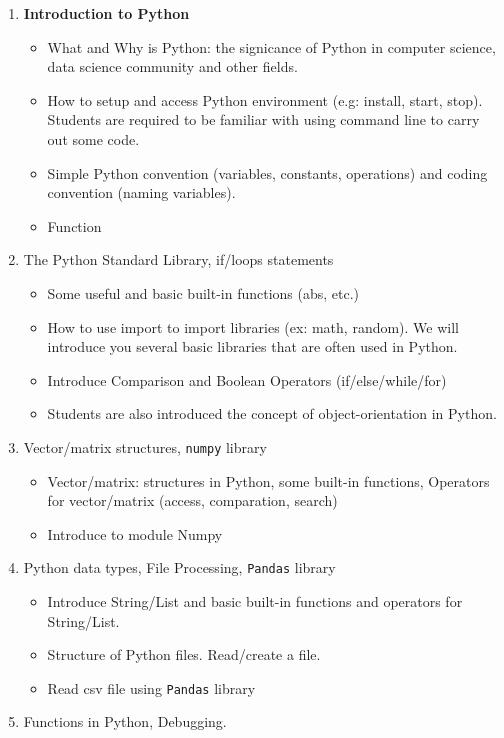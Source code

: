 \documentclass[11pt]{article}
\providecommand{\tightlist}{%
      \setlength{\itemsep}{0pt}\setlength{\parskip}{0pt}}
\begin{document}
\begin{enumerate}
\def\labelenumi{\arabic{enumi}.}
\item
  \textbf{Introduction to Python}

  \begin{itemize}
  \tightlist
  \item
    What and Why is Python: the signicance of Python in computer
    science, data science community and other fields.
  \item
    How to setup and access Python environment (e.g: install, start,
    stop). Students are required to be familiar with using command line
    to carry out some code.
  \item
    Simple Python convention (variables, constants, operations) and
    coding convention (naming variables).
  \item
    Function
  \end{itemize}
\item
  The Python Standard Library, if/loops statements

  \begin{itemize}
  \tightlist
  \item
    Some useful and basic built-in functions (abs, etc.)
  \item
    How to use import to import libraries (ex: math, random). We will
    introduce you several basic libraries that are often used in Python.
  \item
    Introduce Comparison and Boolean Operators (if/else/while/for)
  \item
    Students are also introduced the concept of object-orientation in
    Python.
  \end{itemize}
\item
  Vector/matrix structures, \texttt{numpy} library

  \begin{itemize}
  \tightlist
  \item
    Vector/matrix: structures in Python, some built-in functions,
    Operators for vector/matrix (access, comparation, search)
  \item
    Introduce to module Numpy
  \end{itemize}
\item
  Python data types, File Processing, \texttt{Pandas} library

  \begin{itemize}
  \tightlist
  \item
    Introduce String/List and basic built-in functions and operators for
    String/List.
  \item
    Structure of Python files. Read/create a file.
  \item
    Read csv file using \texttt{Pandas} library
  \end{itemize}
\item
  Functions in Python, Debugging.


\end{enumerate}
\end{document}
